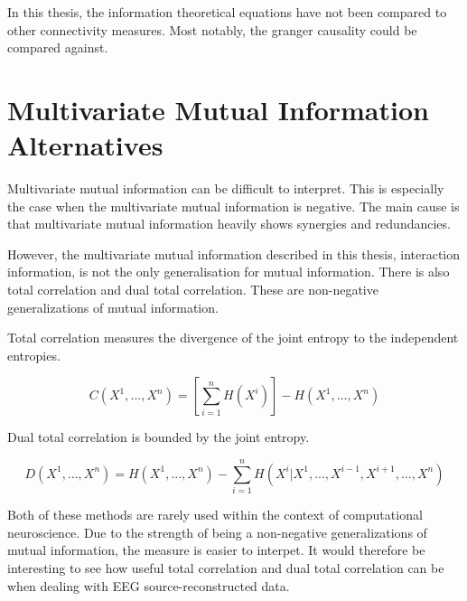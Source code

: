In this thesis, the information theoretical equations have not been compared to other connectivity measures. Most notably, the granger causality could be compared against. 

\section{Multivariate Mutual Information Alternatives}

Multivariate mutual information can be difficult to interpret. This is especially the case when the multivariate mutual information is negative. The main cause is that multivariate mutual information heavily shows synergies and redundancies.

However, the multivariate mutual information described in this thesis, interaction information, is not the only generalisation for mutual information. There is also total correlation and dual total correlation. These are non-negative generalizations of mutual information.

Total correlation measures the divergence of the joint entropy to the independent entropies.

\begin{equation}
C(X^1,...,X^n) = [\sum^{n}_{i=1}H(X^i)] - H(X^1,...,X^n)
\end{equation}

Dual total correlation is bounded by the joint entropy.

\begin{equation}
D(X^1,...,X^n) = H(X^1,...,X^n) - \sum^{n}_{i=1}H(X^i | X^1,...,X^{i-1},X^{i+1},...,X^n)
\end{equation}

Both of these methods are rarely used within the context of computational neuroscience. Due to the strength of being a non-negative generalizations of mutual information, the measure is easier to interpet. It would therefore be interesting to see how useful total correlation and dual total correlation can be when dealing with EEG source-reconstructed data.